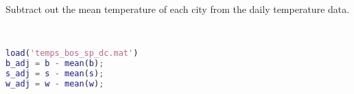 Subtract out the mean temperature of each city from the daily temperature data.

\begin{solution} \
    \begin{lstlisting}[language=Matlab]
load('temps_bos_sp_dc.mat')
b_adj = b - mean(b);
s_adj = s - mean(s);
w_adj = w - mean(w);
    \end{lstlisting}
\end{solution}
